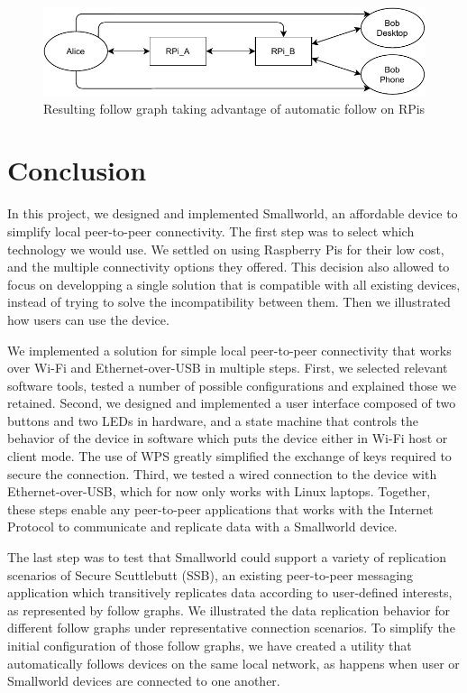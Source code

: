\documentclass[a4paper,11pt,oneside]{report}
\begin{document}
\begin{figure}
  \includegraphics[width=\linewidth]{figures/complexFinal.pdf}
  \caption{Resulting follow graph taking advantage of automatic follow on RPis}
  \label{fig:complexFinal}
\end{figure}

\chapter{Conclusion}

In this project, we designed and implemented Smallworld, an affordable device to simplify local peer-to-peer connectivity. The first step was to select which technology we would use. We settled on using Raspberry Pis for their low cost, and the multiple connectivity options they offered. This decision also allowed to focus on developping a single solution that is compatible with all existing devices, instead of trying to solve the incompatibility between them. Then we illustrated how users can use the device.

We implemented a solution for simple local peer-to-peer connectivity that works over Wi-Fi and Ethernet-over-USB in multiple steps. First, we selected relevant software tools, tested a number of possible configurations and explained those we retained. Second, we designed and implemented a user interface composed of two buttons and two LEDs in hardware, and a state machine that controls the behavior of the device in software which puts the device either in Wi-Fi host or client mode. The use of WPS greatly simplified the exchange of keys required to secure the connection. Third, we tested a wired connection to the device with Ethernet-over-USB, which for now only works with Linux laptops. Together, these steps enable any peer-to-peer applications that works with the Internet Protocol to communicate and replicate data with a Smallworld device.

The last step was to test that Smallworld could support a variety of replication scenarios of Secure Scuttlebutt (SSB), an existing peer-to-peer messaging application which transitively replicates data according to user-defined interests, as represented by follow graphs. We illustrated the data replication behavior for different follow graphs under representative connection scenarios. To simplify the initial configuration of those follow graphs, we have created a utility that automatically follows devices on the same local network, as happens when user or Smallworld devices are connected to one another.
\end{document}
